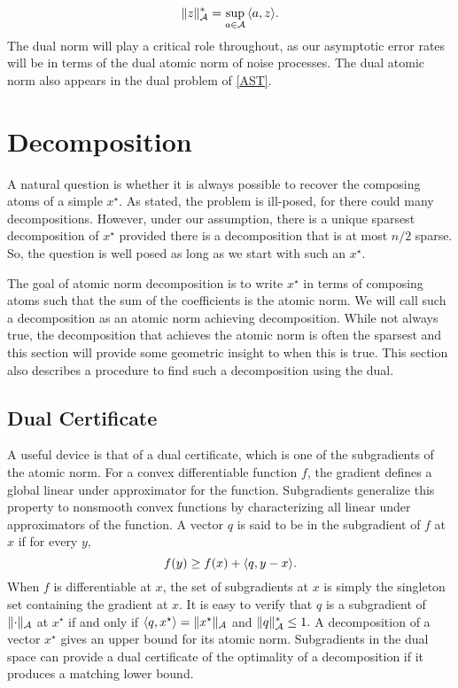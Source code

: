 \begin{equation}
\lVert z\rVert_{\mathcal{A}}^* = \sup_{a \in \mathcal{A}}{\langle a, z\rangle}.\label{bonsall}
\end{equation}
The dual norm will play a critical role throughout, as our asymptotic error
rates will be in terms of the dual atomic norm of noise processes. The dual
atomic norm also appears in the dual problem of \eqref{AST}.

\section{Decomposition}
\label{sec:decomposition}

A natural question is whether it is always possible to recover the composing
atoms of a simple $x^\star$. As stated, the problem is ill-posed, for there
could many decompositions. However, under our assumption, there is a unique
sparsest decomposition of $x^\star$ provided there is a decomposition that is at
most $n/2$ sparse. So, the question is well posed as long as we start with such
an $x^\star.$

The goal of atomic norm decomposition is to write $x^\star$ in terms of
composing atoms such that the sum of the coefficients is the atomic norm. We
will call such a decomposition as an atomic norm achieving decomposition. While
not always true, the decomposition that achieves the atomic norm is often the
sparsest and this section will provide some geometric insight to when this is
true. This section also describes a procedure to find such a decomposition using
the dual.

\subsection{Dual Certificate}

A useful device is that of a dual certificate, which is one of the subgradients
of the atomic norm. For a convex differentiable function $f$, the gradient
defines a global linear under approximator for the function. Subgradients
generalize this property to nonsmooth convex functions by characterizing all
linear under approximators of the function. A vector $q$ is said to be in the subgradient of $f$ at $x$ if for every $y,$
\[
	f(y) \geq f(x) + \langle q, y-x\rangle.
\]
When $f$ is differentiable at $x$, the set of subgradients at $x$ is simply the
singleton set containing the gradient at $x$. It is easy to verify that $q$ is a
subgradient of $\lVert\cdot\rVert_{\mathcal{A}} $ at $x^\star$ if and only if $\langle q,
x^\star \rangle = \lVert x^\star\rVert_{\mathcal{A}}$ and $\lVert q\rVert_{\mathcal{A}}^* \leq 1.$ A
decomposition of a vector $x^\star$ gives an upper bound for its atomic norm.
Subgradients in the dual space can provide a dual certificate of the optimality
of a decomposition if it produces a matching lower bound.

